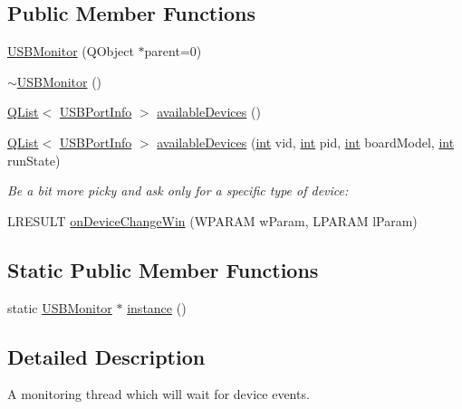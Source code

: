 \subsection*{Public Member Functions}
\begin{DoxyCompactItemize}
\item 
\hyperlink{group___raw_h_i_d_plugin_ga1de6bdbd3deee4991e3b910e6d274121}{U\-S\-B\-Monitor} (Q\-Object $\ast$parent=0)
\item 
\hyperlink{group___raw_h_i_d_plugin_ga0a472129bd25e3c7972ce78ca52ed19d}{$\sim$\-U\-S\-B\-Monitor} ()
\item 
\hyperlink{class_q_list}{Q\-List}$<$ \hyperlink{struct_u_s_b_port_info}{U\-S\-B\-Port\-Info} $>$ \hyperlink{group___raw_h_i_d_plugin_gaf7da3cc1fc2b9085f5647f0d3822ade1}{available\-Devices} ()
\item 
\hyperlink{class_q_list}{Q\-List}$<$ \hyperlink{struct_u_s_b_port_info}{U\-S\-B\-Port\-Info} $>$ \hyperlink{group___raw_h_i_d_plugin_ga8b0ce433f3d1f5907b290b1f4185984d}{available\-Devices} (\hyperlink{ioapi_8h_a787fa3cf048117ba7123753c1e74fcd6}{int} vid, \hyperlink{ioapi_8h_a787fa3cf048117ba7123753c1e74fcd6}{int} pid, \hyperlink{ioapi_8h_a787fa3cf048117ba7123753c1e74fcd6}{int} board\-Model, \hyperlink{ioapi_8h_a787fa3cf048117ba7123753c1e74fcd6}{int} run\-State)
\begin{DoxyCompactList}\small\item\em Be a bit more picky and ask only for a specific type of device\-: \end{DoxyCompactList}\item 
L\-R\-E\-S\-U\-L\-T \hyperlink{group___raw_h_i_d_plugin_ga108b55e821dbc91874e52cdb7cb71150}{on\-Device\-Change\-Win} (W\-P\-A\-R\-A\-M w\-Param, L\-P\-A\-R\-A\-M l\-Param)
\end{DoxyCompactItemize}
\subsection*{Static Public Member Functions}
\begin{DoxyCompactItemize}
\item 
static \hyperlink{class_u_s_b_monitor}{U\-S\-B\-Monitor} $\ast$ \hyperlink{group___raw_h_i_d_plugin_gabcb44085db71f0bd0a1513d25a572b33}{instance} ()
\end{DoxyCompactItemize}


\subsection{Detailed Description}
A monitoring thread which will wait for device events. 

